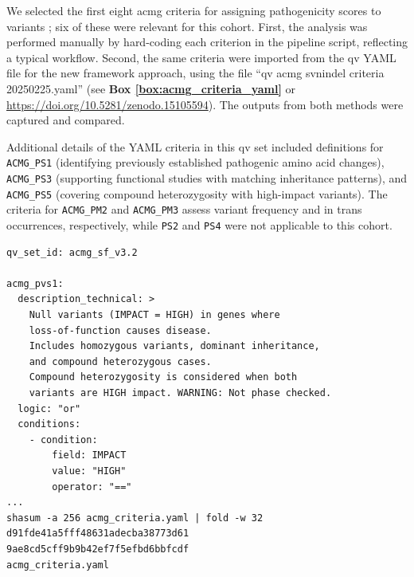 We selected the first eight \ac{acmg} criteria for assigning pathogenicity scores to variants \cite{richards2015standards}; six of these were relevant for this cohort. First, the analysis was performed manually by hard-coding each criterion in the pipeline script, reflecting a typical workflow. Second, the same criteria were imported from the \ac{qv} YAML file for the new framework approach, using the file ``qv acmg svnindel criteria 20250225.yaml'' (see \textbf{Box \ref{box:acmg_criteria_yaml}} or \url{https://doi.org/10.5281/zenodo.15105594}).
The outputs from both methods were captured and compared.

Additional details of the YAML criteria in this \ac{qv} set included definitions for \texttt{ACMG\_PS1} (identifying previously established pathogenic amino acid changes), \texttt{ACMG\_PS3} (supporting functional studies with matching inheritance patterns), and \texttt{ACMG\_PS5} (covering compound heterozygosity with high-impact variants). The criteria for \texttt{ACMG\_PM2} and \texttt{ACMG\_PM3} assess variant frequency and in trans occurrences, respectively, while \texttt{PS2} and \texttt{PS4} were not applicable to this cohort.


\begin{tcolorbox}[
    colback=white!0,
    colframe=black,
    boxrule=1pt,
    arc=1mm,
    outer arc=1mm,
    title=\textbf{\refstepcounter{myboxcounter}\label{box:acmg_criteria_yaml}Box \themyboxcounter: qv\_files/acmg\_criteria.yaml}
]
\begin{verbatim}
qv_set_id: acmg_sf_v3.2

acmg_pvs1:
  description_technical: >
    Null variants (IMPACT = HIGH) in genes where 
    loss-of-function causes disease.
    Includes homozygous variants, dominant inheritance, 
    and compound heterozygous cases.
    Compound heterozygosity is considered when both 
    variants are HIGH impact. WARNING: Not phase checked.
  logic: "or"
  conditions:
    - condition:
        field: IMPACT
        value: "HIGH"
        operator: "=="
...
shasum -a 256 acmg_criteria.yaml | fold -w 32
d91fde41a5fff48631adecba38773d61
9ae8cd5cff9b9b42ef7f5efbd6bbfcdf
acmg_criteria.yaml
\end{verbatim}
\end{tcolorbox}


